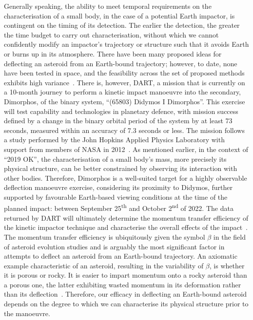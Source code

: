 Generally speaking, the ability to meet temporal requirements on the characterisation of a small body, in the case of a potential Earth impactor, is contingent on the timing of its detection. The earlier the detection, the greater the time budget to carry out characterisation, without which we cannot confidently modify an impactor's trajectory or structure such that it avoids Earth or burns up in its atmosphere. There have been many proposed ideas for deflecting an asteroid from an Earth-bound trajectory; however, to date, none have been tested in space, and the feasibility across the set of proposed methods exhibits high variance~\cite{Harris2015}. There is, however,  \gls{DART}, a mission that is currently on a 10-month journey to perform a kinetic impact manoeuvre into the secondary, Dimorphos, of the binary system, ``(65803) Didymos I Dimorphos''. This exercise will test  capability and technologies in planetary defence, with mission success defined by a change in the binary orbital period of the system by at least 73 seconds, measured within an accuracy of 7.3 seconds or less. The mission follows a study performed by the John Hopkins Applied Physics Laboratory with support from members of \gls{NASA} in 2012~\cite{Cheng2012}. As mentioned earlier, in the context of ``2019 OK'', the characterisation of a small body's mass, more precisely its physical structure, can be better constrained by observing its interaction with other bodies. Therefore, Dimorphos is a well-suited target for a highly observable deflection manoeuvre exercise, considering its proximity to Didymos, further supported by favourable Earth-based viewing conditions at the time of the planned impact: between September 25\textsuperscript{th} and October 2\textsuperscript{nd} of 2022. The data returned by \gls{DART} will ultimately determine the momentum transfer efficiency of the kinetic impactor technique and characterise the overall effects of the impact~\cite{Cheng2012, Rivkin2021}. The momentum transfer efficiency is ubiquitously given the symbol $\beta$ in the field of asteroid evolution studies and is arguably the most significant factor in attempts to deflect an asteroid from an Earth-bound trajectory. An axiomatic example characteristic of an asteroid, resulting in the variability of $\beta$, is whether it is porous or rocky. It is easier to impart momentum onto a rocky asteroid than a porous one, the latter exhibiting wasted momentum in its deformation rather than its deflection~\cite{Holsapple2012}. Therefore, our efficacy in deflecting an Earth-bound asteroid depends on the degree to which we can characterise its physical structure prior to the manoeuvre.

